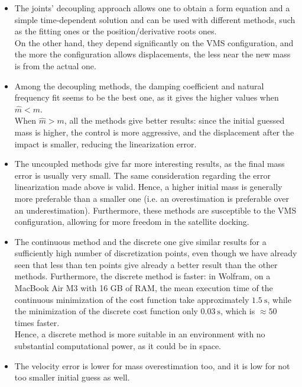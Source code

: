 \documentclass[a4paper,12pt,oneside]{report}
\begin{document}
\begin{itemize}
  \item The joints' decoupling approach allows one to obtain a form equation and a simple time-dependent solution and can be used with different methods, such as the fitting ones or the position/derivative roots ones.\\
    On the other hand, they depend significantly on the VMS configuration, and the more the configuration allows displacements, the less near the new mass is from the actual one.
  \item Among the decoupling methods, the damping coefficient and natural frequency fit seems to be the best one, as it gives the higher values when $\hat{m}<m$.\\
    When $\hat{m}>m$, all the methods give better results: since the initial guessed mass is higher, the control is more aggressive, and the displacement after the impact is smaller, reducing the linearization error.
  \item The uncoupled methods give far more interesting results, as the final mass error is usually very small. The same consideration regarding the error linearization made above is valid. Hence, a higher initial mass is generally more preferable than a smaller one (i.e. an overestimation is preferable over an underestimation).
    Furthermore, these methods are susceptible to the VMS configuration, allowing for more freedom in the satellite docking.
  \item The continuous method and the discrete one give similar results for a sufficiently high number of discretization points, even though we have already seen that less than ten points give already a better result than the other methods. Furthermore, the discrete method is faster: in Wolfram, on a MacBook Air M3 with 16 GB of RAM, the mean execution time of the continuous minimization of the cost function take approximately $\SI{1.5}{\second}$, while the minimization of the discrete cost function only $\SI{0.03}{\second}$, which is $\approx 50$ times faster.\\
    Hence, a discrete method is more suitable in an environment with no substantial computational power, as it could be in space.
  \item The velocity error is lower for mass overestimation too, and it is low for not too smaller initial guess as well.
\end{itemize}
\newpage
\end{document}
